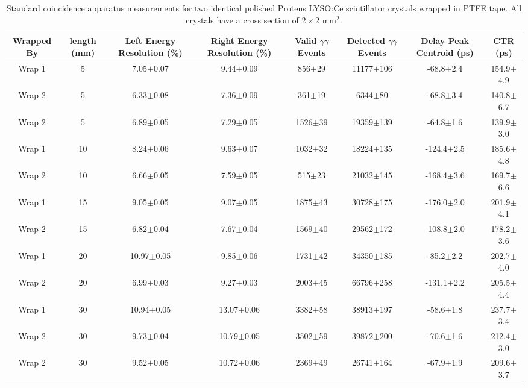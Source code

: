 \begin{table}
\caption{\label{tab:standardctr} Standard coincidence apparatus measurements for two identical polished Proteus LYSO:Ce scintillator crystals wrapped in PTFE tape. All crystals have a cross section of $2\times2$ mm$^2$.}
\begin{tabular}{cccccccc}
\hline
Wrapped By &  length (mm) & Left Energy Resolution (\%) & Right Energy Resolution (\%) &Valid $\gamma\gamma$ Events & Detected $\gamma\gamma$ Events & Delay Peak Centroid (ps) & CTR (ps)\\
\hline
    Wrap 1 &      5 &   7.05$\pm$0.07 &   9.44$\pm$0.09 &   856$\pm$29 &  11177$\pm$106 &   -68.8$\pm$2.4 &  154.9$\pm$4.9 \\
    Wrap 2 &      5 &   6.33$\pm$0.08 &   7.36$\pm$0.09 &   361$\pm$19 &    6344$\pm$80 &   -68.8$\pm$3.4 &  140.8$\pm$6.7 \\
    Wrap 2 &      5 &   6.89$\pm$0.05 &   7.29$\pm$0.05 &  1526$\pm$39 &  19359$\pm$139 &   -64.8$\pm$1.6 &  139.9$\pm$3.0 \\
    Wrap 1 &     10 &   8.24$\pm$0.06 &   9.63$\pm$0.07 &  1032$\pm$32 &  18224$\pm$135 &  -124.4$\pm$2.5 &  185.6$\pm$4.8 \\
    Wrap 2 &     10 &   6.66$\pm$0.05 &   7.59$\pm$0.05 &   515$\pm$23 &  21032$\pm$145 &  -168.4$\pm$3.6 &  169.7$\pm$6.6 \\
    Wrap 1 &     15 &   9.05$\pm$0.05 &   9.07$\pm$0.05 &  1875$\pm$43 &  30728$\pm$175 &  -176.0$\pm$2.0 &  201.9$\pm$4.1 \\
    Wrap 2 &     15 &   6.82$\pm$0.04 &   7.67$\pm$0.04 &  1569$\pm$40 &  29562$\pm$172 &  -108.8$\pm$2.0 &  178.2$\pm$3.6 \\
    Wrap 1 &     20 &  10.97$\pm$0.05 &   9.85$\pm$0.06 &  1731$\pm$42 &  34350$\pm$185 &   -85.2$\pm$2.2 &  202.7$\pm$4.0 \\
    Wrap 2 &     20 &   6.99$\pm$0.03 &   9.27$\pm$0.03 &  2003$\pm$45 &  66796$\pm$258 &  -131.1$\pm$2.2 &  205.5$\pm$4.4 \\
    Wrap 1 &     30 &  10.94$\pm$0.05 &  13.07$\pm$0.06 &  3382$\pm$58 &  38913$\pm$197 &   -58.6$\pm$1.8 &  237.7$\pm$3.4 \\
    Wrap 2 &     30 &   9.73$\pm$0.04 &  10.79$\pm$0.05 &  3502$\pm$59 &  39872$\pm$200 &   -70.6$\pm$1.6 &  212.4$\pm$3.0 \\
    Wrap 2 &     30 &   9.52$\pm$0.05 &  10.72$\pm$0.06 &  2369$\pm$49 &  26741$\pm$164 &   -67.9$\pm$1.9 &  209.6$\pm$3.7 \\
\hline
\end{tabular}
\end{table}


